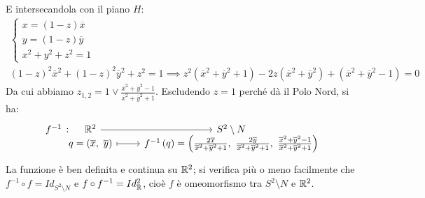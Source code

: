 E intersecandola con il piano $H$:
\begin{gather*}
	\begin{cases}
		x=\left(1-z\right)\overline{x}\\
		y=\left(1-z\right)\overline{y}\\
		x^2+y^2+z^2=1
	\end{cases}\\
	\left(1-z\right)^2\overline{x}^2+\left(1-z\right)^2\overline{y}^2+z^2=1  \implies z^2\left(\overline{x}^2+\overline{y}^2+1\right)-2z\left(\overline{x}^2+\overline{y}^2\right)+\left(\overline{x}^2+\overline{y}^2-1\right)=0
\end{gather*}
Da cui abbiamo $z_{1,2}=1 \vee \frac{\overline{x}^2+\overline{y}^2-1}{\overline{x}^2+\overline{y}^2+1}$. Escludendo $z=1$ perché dà il Polo Nord, si ha:
\begin{equation}
	\funztot{f^{-1}}{\realset^2}{S^2\setminus N}{q=\left(\overline{x},\ \overline{y}\right)}{f^{-1}\left(q\right)=\left(\frac{2\overline{x}}{\overline{x}^2+\overline{y}^2+1},\ \frac{2\overline{y}}{\overline{x}^2+\overline{y}^2+1},\ \frac{\overline{x}^2+\overline{y}^2-1}{\overline{x}^2+\overline{y}^2+1}\right)}
\end{equation}
La funzione è ben definita e continua su $\mathbb{R}^2$; si verifica più o meno facilmente che $f^{-1}\circ f=Id_{S^2\setminus N}$ e $f\circ f^{-1}=Id_{\mathbb{R}}^{2}$, cioè $f$ è omeomorfismo tra $S^2\setminus N$ e $\mathbb{R}^2$.
